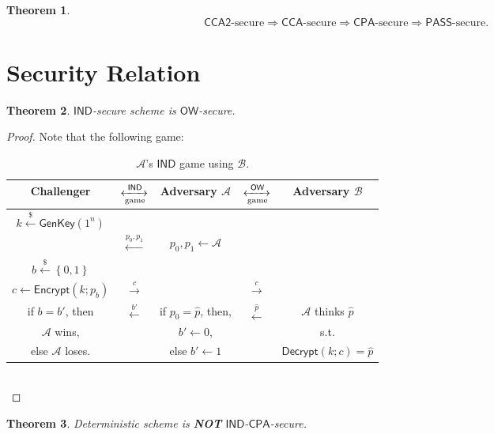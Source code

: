 \documentclass[12pt,openany]{book}
\newtheorem{theorem}{Theorem}[chapter]
\theoremstyle{definition}
\newcommand{\set}[1]{\left\{#1\right\}}
\newcommand{\dollar}{\$}
\newcommand{\uniform}{\xleftarrow{\dollar}}
\newcommand{\A}{\mathcal{A}}
\newcommand{\OW}{\mathsf{OW}}
\newcommand{\IND}{\mathsf{IND}}
\newcommand{\PASS}{\mathsf{PASS}}
\newcommand{\CPA}{\mathsf{CPA}}
\newcommand{\CCA}{\mathsf{CCA}}
\newcommand{\CCATwo}{\mathsf{CCA2}}
\newcommand{\GenKey}{\mathsf{GenKey}}
\newcommand{\Encrypt}{\mathsf{Encrypt}}
\newcommand{\Decrypt}{\mathsf{Decrypt}}
\begin{document}
	\begin{tcolorbox}[colback=white,colframe=thmcolor,arc=5pt,title={\color{white}\bf }]
		\begin{theorem}
			\[
			\text{$\CCATwo$-secure}\Rightarrow\text{$\CCA$-secure}\Rightarrow\text{$\CPA$-secure}\Rightarrow\text{$\PASS$-secure}.
			\]
		\end{theorem}
	\end{tcolorbox}
	
	\newpage
	\section{Security Relation}
	\begin{tcolorbox}[colback=white,colframe=thmcolor,arc=5pt,title={\color{white}\bf }]
		\begin{theorem}
			$\IND$-secure scheme is $\OW$-secure.
		\end{theorem}
	\end{tcolorbox}
	\begin{proof}
		Note that the following game: \begin{table}[h]
			\centering\begin{tabular}{ccccc}
				\toprule[1.5pt]
				Challenger & $\xleftrightarrow[\textnormal{game}]{\IND}$ & Adversary $\mathcal{A}$ & $\xleftrightarrow[\textnormal{game}]{\OW}$ & Adversary $\mathcal{B}$ \\
				\midrule
				$k\uniform\GenKey(1^n)$\\
				& $\xleftarrow{p_0,p_1}$ & $p_0,p_1\gets\A$\\
				$b\uniform\set{0,1}$\\
				\midrule
				$c\gets\Encrypt(k;p_b)$ & $\xrightarrow{c}$ & & $\xrightarrow{c}$\\
				\midrule
				if $b=b'$, then & \multirow{3}{*}{$\xleftarrow{b'}$} & if $p_0=\hat{p}$, then, &\multirow{3}{*}{$\xleftarrow{\hat{p}}$} & $\A$ thinks $\hat{p}$ \\
				$\mathcal{A}$ wins, & & $b'\gets 0$, & & s.t.\\
				else $\mathcal{A}$ loses. & & else $b'\gets 1$ & & $\Decrypt(k;c)=\hat{p}$\\
				\bottomrule[1.5pt]
			\end{tabular}
			\caption{$\mathcal{A}$'s $\IND$ game using $\mathcal{B}$.}
		\end{table}\\
	\end{proof}
	\vspace{8pt}
	\begin{tcolorbox}[colback=white,colframe=thmcolor,arc=5pt,title={\color{white}\bf }]
		\begin{theorem}
			Deterministic scheme is \textbf{NOT} $\IND$-$\CPA$-secure.
		\end{theorem}
	\end{tcolorbox}
\end{document}

